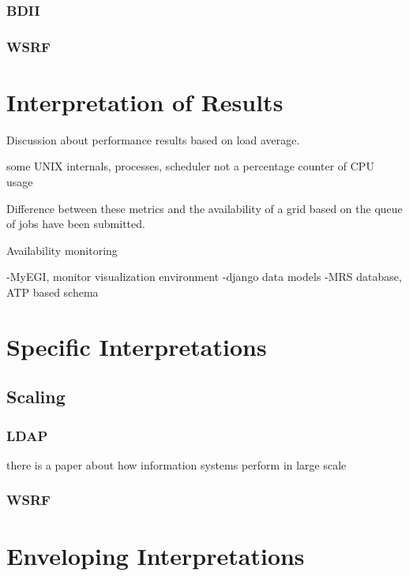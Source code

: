 \subsubsection{BDII}

\subsubsection{WSRF}

\newpage

\section{Interpretation of Results}


Discussion about performance results based on
load average.

some UNIX internals, processes, scheduler
not a percentage counter of CPU usage

\newpage

Difference between these metrics and the availability of 
a grid based on the queue of jobs have been submitted.

Availability monitoring

-MyEGI, monitor visualization environment
-django data models
-MRS database, ATP based schema

\newpage

\section{Specific Interpretations}

\subsection{Scaling}
\subsubsection{LDAP}

there is a paper about how information systems perform in large scale

\newpage

\subsubsection{WSRF}
\newpage
\section{Enveloping Interpretations}
